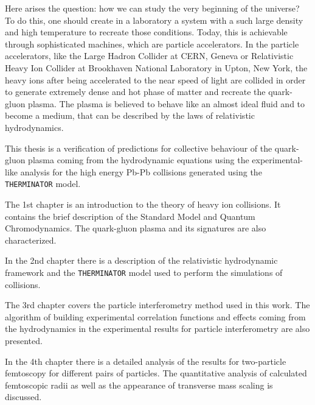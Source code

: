 Here arises the question: how we can study the very beginning of the universe?
To do this, one should create in a laboratory a system with a such large density and high temperature to recreate those conditions.
Today, this is achievable through sophisticated machines, which are particle accelerators.
In the particle accelerators, like the Large Hadron Collider at CERN, Geneva or Relativistic Heavy Ion Collider at Brookhaven National Laboratory in Upton, New York, the heavy ions after being accelerated to the near speed of light are collided in order to generate extremely dense and hot phase of matter and recreate the quark-gluon plasma.
The plasma is believed to behave like an almost ideal fluid and to become a medium, that can be described by the laws of relativistic hydrodynamics.

This thesis is a verification of predictions for collective behaviour of the quark-gluon plasma coming from the hydrodynamic equations using the experimental-like analysis for the high energy Pb-Pb collisions generated using the \verb|THERMINATOR| model.

The 1st chapter is an introduction to the theory of heavy ion collisions.
It contains the brief description of the Standard Model and Quantum Chromodynamics.
The quark-gluon plasma and its signatures are also characterized.

In the 2nd chapter there is a description of the relativistic hydrodynamic framework and the \verb|THERMINATOR| model used to perform the simulations of collisions.

The 3rd chapter covers the particle interferometry method used in this work.
The algorithm of building experimental correlation functions and effects coming from the hydrodynamics in the experimental results for particle interferometry are also presented.

In the 4th chapter there is a detailed analysis of the results for two-particle femtoscopy for different pairs of particles.
The quantitative analysis of calculated femtoscopic radii as well as the appearance of transverse mass scaling is discussed.
